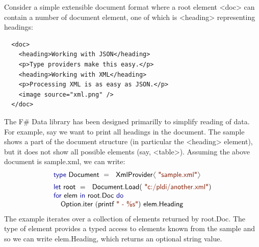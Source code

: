 \documentclass[10pt,preprint,blind,clearpagebib]{sigplanconf}
\newcommand{\langl}{\begin{picture}(4.5,7)
\put(1.1,2.5){\rotatebox{60}{\line(1,0){5.5}}}
\put(1.1,2.5){\rotatebox{300}{\line(1,0){5.5}}}
\end{picture}}
\newcommand{\rangl}{\begin{picture}(4.5,7)
\put(.9,2.5){\rotatebox{120}{\line(1,0){5.5}}}
\put(.9,2.5){\rotatebox{240}{\line(1,0){5.5}}}
\end{picture}}
\newcommand{\kvd}[1]{\textnormal{\textcolor{kvdclr}{\sffamily #1}}}
\newcommand{\str}[1]{\textnormal{\textcolor{strclr}{\sffamily "#1"}}}
\newcommand{\strf}[1]{\textnormal{\textcolor{strclr}{\sffamily #1}}}
\newcommand{\ident}[1]{\textnormal{\sffamily #1}}
\begin{document}
Consider a simple extensible document format where a root element
{\ttfamily\small <doc>} can contain a number of document element, one of which is
{\ttfamily\small <heading>} representing headings:
%
{\small{
\begin{verbatim}
  <doc>
    <heading>Working with JSON</heading>
    <p>Type providers make this easy.</p>
    <heading>Working with XML</heading>
    <p>Processing XML is as easy as JSON.</p>
    <image source="xml.png" />
  </doc>
\end{verbatim}
}}
%
\noindent
The F\# Data library has been designed primarilly to simplify reading of data. For example,
say we want to print all headings in the document. The sample shows a part of the document structure 
(in particular the {\ttfamily\small <heading>} element), but it does not show all possible elements 
(say, {\ttfamily\small <table>}). Assuming the above document is \strf{sample.xml}, we can write:
%
\noindent
\begin{equation*}
\begin{array}{l}
 \kvd{type}~\ident{Document}~=~\ident{XmlProvider}\langl\str{sample.xml}\rangl\hspace{1em} \\[0.5em]
 \kvd{let}~\ident{root}~=~\ident{Document.Load}(\str{c:/pldi/another.xml})\\
 \kvd{for}~\ident{elem}~\kvd{in}~\ident{root.Doc}~\kvd{do}\\
 \quad\ident{Option.iter}~(\ident{printf}~\str{ - \%s})~\ident{elem.Heading}\\
\end{array}
\end{equation*}
%
The example iterates over a collection of elements returned by \ident{root.Doc}. The type of element 
provides a typed access to elements known from the sample and so we can write \ident{elem.Heading}, 
which returns an optional string value.
\end{document}
